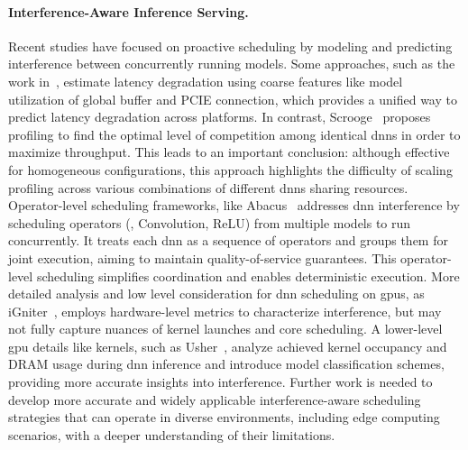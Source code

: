 \paragraph{Interference-Aware Inference Serving.}
Recent studies have focused on proactive scheduling by modeling and predicting interference between concurrently running models. 
Some approaches, such as the work in~\cite{mendoza2021interference}, estimate latency degradation using coarse features like model utilization of global buffer and PCIE connection, which provides a unified way to predict latency degradation across platforms. 
In contrast, Scrooge~\cite{hu2021scrooge} proposes profiling to find the optimal level of competition among identical \acrshort{dnn}s in order to maximize throughput. This leads to an important conclusion: although effective for homogeneous configurations, this approach highlights the difficulty of scaling profiling across various combinations of different \acrshort{dnn}s sharing resources.
Operator-level scheduling frameworks, like Abacus~\cite{cui2021Abacus} addresses \acrshort{dnn} interference by scheduling operators (\eg, Convolution, ReLU) from multiple models to run concurrently. It treats each \acrshort{dnn} as a sequence of operators and groups them for joint execution, aiming to maintain quality-of-service guarantees. This operator-level scheduling simplifies coordination and enables deterministic execution.
More detailed analysis and low level consideration for \acrshort{dnn} scheduling on \acrshort{gpu}s, as iGniter~\cite{xu2022igniter}, employs hardware-level metrics to characterize interference, but may not fully capture nuances of kernel launches and core scheduling.
A lower-level \acrshort{gpu} details like kernels, such as Usher~\cite{shubha2024usher}, analyze achieved kernel occupancy and DRAM usage during \acrshort{dnn} inference and introduce model classification schemes, providing more accurate insights into interference.
Further work is needed to develop more accurate and widely applicable interference-aware scheduling strategies that can operate in diverse environments, including edge computing scenarios, with a deeper understanding of their limitations.